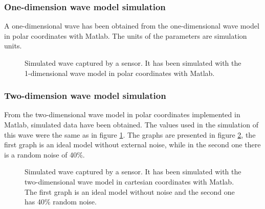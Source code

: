 \documentclass[12pt, a4paper]{article} %
\begin{document}
\setlength{\parskip}{0mm}

\newpage
\subsubsection{One-dimension wave model simulation}

\setlength{\parskip}{0mm}

A one-dimensional wave has been obtained from the one-dimensional wave model in polar coordinates with Matlab. The units of the parameters are simulation units.

\setlength{\parskip}{4mm}

\begin{figure}[htbp]
    \centering
    
    \caption{Simulated wave captured by a sensor. It has been simulated with the 1-dimensional wave model in polar coordinates with Matlab.}
    \label{fig:modelo1}
\end{figure}

\setlength{\parskip}{0mm}

\subsubsection{Two-dimension wave model simulation}

From the two-dimensional wave model in polar coordinates implemented in Matlab, simulated data have been obtained. The values used in the simulation of this wave were the same as in figure \ref{fig:modelo1}. The graphs are presented in figure \ref{fig:modelo2}, the first graph is an ideal model without external noise, while in the second one there is a random noise of 40\%.

\setlength{\parskip}{4mm}

\begin{figure}[h!]
    \centering
    
    \caption{Simulated wave captured by a sensor. It has been simulated with the two-dimensional wave model in cartesian coordinates with Matlab. The first graph is an ideal model without noise and the second one has 40\% random noise.}
    \label{fig:modelo2}
\end{figure}
\end{document}
